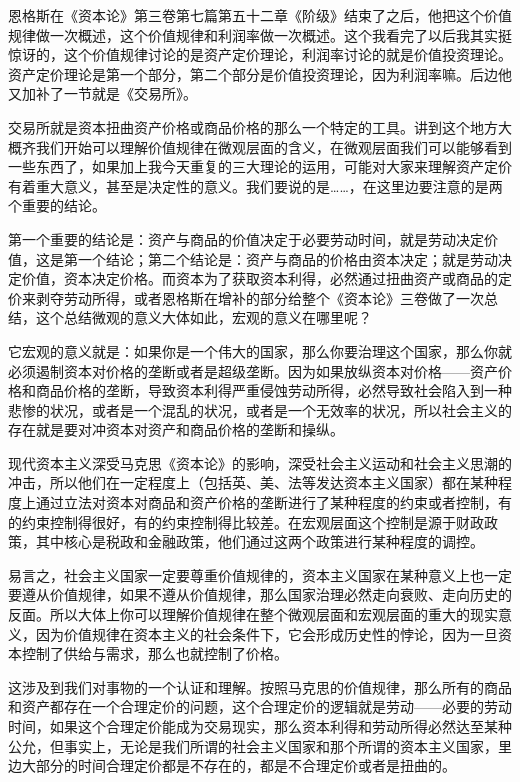 \documentclass[UTF8, 12pt, a4paper]{ctexrep}
\begin{document}
恩格斯在《资本论》第三卷第七篇第五十二章《阶级》结束了之后，他把这个价值规律做一次概述，这个价值规律和利润率做一次概述。这个我看完了以后我其实挺惊讶的，这个价值规律讨论的是资产定价理论，利润率讨论的就是价值投资理论。资产定价理论是第一个部分，第二个部分是价值投资理论，因为利润率嘛。后边他又加补了一节就是《交易所》。

交易所就是资本扭曲资产价格或商品价格的那么一个特定的工具。讲到这个地方大概齐我们开始可以理解价值规律在微观层面的含义，在微观层面我们可以能够看到一些东西了，如果加上我今天重复的三大理论的运用，可能对大家来理解资产定价有着重大意义，甚至是决定性的意义。我们要说的是……，在这里边要注意的是两个重要的结论。

第一个重要的结论是：资产与商品的价值决定于必要劳动时间，就是劳动决定价值，这是第一个结论；第二个结论是：资产与商品的价格由资本决定；就是劳动决定价值，资本决定价格。而资本为了获取资本利得，必然通过扭曲资产或商品的定价来剥夺劳动所得，或者恩格斯在增补的部分给整个《资本论》三卷做了一次总结，这个总结微观的意义大体如此，宏观的意义在哪里呢？

它宏观的意义就是：如果你是一个伟大的国家，那么你要治理这个国家，那么你就必须遏制资本对价格的垄断或者是超级垄断。因为如果放纵资本对价格——资产价格和商品价格的垄断，导致资本利得严重侵蚀劳动所得，必然导致社会陷入到一种悲惨的状况，或者是一个混乱的状况，或者是一个无效率的状况，所以社会主义的存在就是要对冲资本对资产和商品价格的垄断和操纵。

现代资本主义深受马克思《资本论》的影响，深受社会主义运动和社会主义思潮的冲击，所以他们在一定程度上（包括英、美、法等发达资本主义国家）都在某种程度上通过立法对资本对商品和资产价格的垄断进行了某种程度的约束或者控制，有的约束控制得很好，有的约束控制得比较差。在宏观层面这个控制是源于财政政策，其中核心是税政和金融政策，他们通过这两个政策进行某种程度的调控。

易言之，社会主义国家一定要尊重价值规律的，资本主义国家在某种意义上也一定要遵从价值规律，如果不遵从价值规律，那么国家治理必然走向衰败、走向历史的反面。所以大体上你可以理解价值规律在整个微观层面和宏观层面的重大的现实意义，因为价值规律在资本主义的社会条件下，它会形成历史性的悖论，因为一旦资本控制了供给与需求，那么也就控制了价格。

这涉及到我们对事物的一个认证和理解。按照马克思的价值规律，那么所有的商品和资产都存在一个合理定价的问题，这个合理定价的逻辑就是劳动——必要的劳动时间，如果这个合理定价能成为交易现实，那么资本利得和劳动所得必然达至某种公允，但事实上，无论是我们所谓的社会主义国家和那个所谓的资本主义国家，里边大部分的时间合理定价都是不存在的，都是不合理定价或者是扭曲的。
\end{document}
